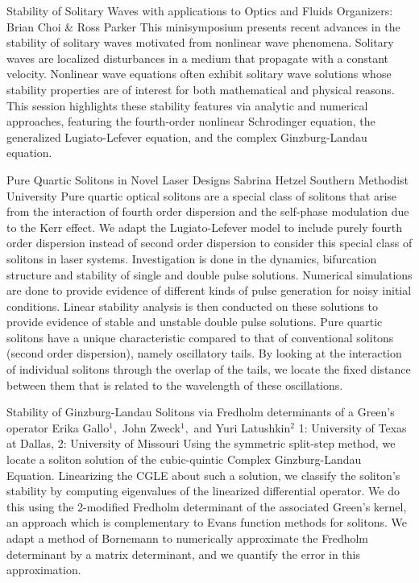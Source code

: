 \label{mini22}

\miniabs
{Stability of Solitary Waves with applications to Optics and Fluids}
{Organizers: Brian Choi \& Ross Parker }
{This minisymposium presents recent advances in the stability of solitary waves motivated from nonlinear wave phenomena. Solitary waves are localized disturbances in a medium that propagate with a constant velocity. Nonlinear wave equations often exhibit solitary wave solutions whose stability properties are of interest for both mathematical and physical reasons. This session highlights these stability features via analytic and numerical approaches, featuring the fourth-order nonlinear Schrodinger equation, the generalized Lugiato-Lefever equation, and the complex Ginzburg-Landau equation.}

\begin{addmargin}[2em]{0em}
\vspace{2ex}
\abs
{Pure Quartic Solitons in Novel Laser Designs}
{Sabrina Hetzel}
{Southern Methodist University}
{Pure quartic optical solitons are a special class of solitons that arise from the interaction of fourth order dispersion and the self-phase modulation due to the Kerr effect. We adapt the Lugiato-Lefever model to include purely fourth order dispersion instead of second order dispersion to consider this special class of solitons in laser systems. Investigation is done in the dynamics, bifurcation structure and stability of single and double pulse solutions. Numerical simulations are done to provide evidence of different kinds of pulse generation for noisy initial conditions. Linear stability analysis is then conducted on these solutions to provide evidence of stable and unstable double pulse solutions. Pure quartic solitons have a unique characteristic compared to that of conventional solitons (second order dispersion), namely oscillatory tails. By looking at the interaction of individual solitons through the overlap of the tails, we locate the fixed distance between them that is related to the wavelength of these oscillations.}


\vspace{1.5ex}
\abs
{Stability of {G}inzburg-{L}andau Solitons via {F}redholm determinants of a {G}reen's operator}
{Erika Gallo$^{1},$ John Zweck$^{1},$ and Yuri Latushkin$^{2}$}
{1: University of Texas at Dallas, 2: University of Missouri}
{Using the symmetric split-step method, we locate a soliton solution of the cubic-quintic Complex {G}inzburg-{L}andau Equation. Linearizing the {CGLE} about such a solution,  we classify the soliton’s stability by computing eigenvalues of the linearized differential operator. We do this using the 2-modified {F}redholm determinant of the associated {G}reen’s kernel, an approach which is complementary to {E}vans function methods for solitons. We adapt a method of {B}ornemann to numerically approximate the {F}redholm determinant by a matrix determinant, and we quantify the error in this approximation.}



\end{addmargin}
